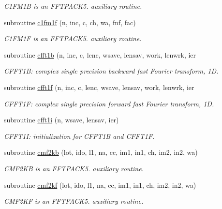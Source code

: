 \begin{DoxyCompactItemize}
\begin{DoxyCompactList}\small\item\em C1\+F\+M1B is an F\+F\+T\+P\+A\+C\+K5. auxiliary routine. \end{DoxyCompactList}\item 
subroutine \mbox{\hyperlink{namespacefftclass_a8870afa6b2bab24460d719026aa6e0d8}{c1fm1f}} (n, inc, c, ch, wa, fnf, fac)
\begin{DoxyCompactList}\small\item\em C1\+F\+M1F is an F\+F\+T\+P\+A\+C\+K5. auxiliary routine. \end{DoxyCompactList}\item 
subroutine \mbox{\hyperlink{namespacefftclass_ad484b97b5f8fc5ab868f25d7be0de7f8}{cfft1b}} (n, inc, c, lenc, wsave, lensav, work, lenwrk, ier
\begin{DoxyCompactList}\small\item\em C\+F\+F\+T1B\+: complex single precision backward fast Fourier transform, 1D. \end{DoxyCompactList}\item 
subroutine \mbox{\hyperlink{namespacefftclass_a8ecbd8fa5a63e3cef089dbe7e91c6438}{cfft1f}} (n, inc, c, lenc, wsave, lensav, work, lenwrk, ier
\begin{DoxyCompactList}\small\item\em C\+F\+F\+T1F\+: complex single precision forward fast Fourier transform, 1D. \end{DoxyCompactList}\item 
subroutine \mbox{\hyperlink{namespacefftclass_a7aaa42c1b45fc7175f2560cd023e4487}{cfft1i}} (n, wsave, lensav, ier)
\begin{DoxyCompactList}\small\item\em C\+F\+F\+T1I\+: initialization for C\+F\+F\+T1B and C\+F\+F\+T1F. \end{DoxyCompactList}\item 
subroutine \mbox{\hyperlink{namespacefftclass_a718a5d0ac7052a9bcbcb9db18430dd61}{cmf2kb}} (lot, ido, l1, na, cc, im1, in1, ch, im2, in2, wa)
\begin{DoxyCompactList}\small\item\em C\+M\+F2\+KB is an F\+F\+T\+P\+A\+C\+K5. auxiliary routine. \end{DoxyCompactList}\item 
subroutine \mbox{\hyperlink{namespacefftclass_a87e04f91c6fd5a8be5cce797b134f4c3}{cmf2kf}} (lot, ido, l1, na, cc, im1, in1, ch, im2, in2, wa)
\begin{DoxyCompactList}\small\item\em C\+M\+F2\+KF is an F\+F\+T\+P\+A\+C\+K5. auxiliary routine. \end{DoxyCompactList}\item 

\end{DoxyCompactItemize}
